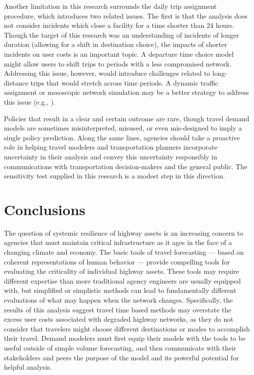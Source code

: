 \documentclass[]{ascelike-new}
\begin{document}
Another limitation in this research surrounds the daily trip assignment
procedure, which introduces two related issues. The first is that the
analysis does not consider incidents which close a facility for a time
shorter than 24 hours. Though the target of this research was an
understanding of incidents of longer duration (allowing for a shift in
destination choice), the impacts of shorter incidents on user costs is
an important topic. A departure time choice model might allow users to
shift trips to periods with a less compromised network. Addressing this
issue, however, would introduce challenges related to long-distance
trips that would stretch across time periods. A dynamic traffic
assignment or mesoscopic network simulation may be a better strategy to
address this issue (e.g., ).

Policies that result in a clear and certain outcome are rare, though
travel demand models are sometimes misinterpreted, misused, or even
mis-designed to imply a single policy prediction. Along the same lines,
agencies should take a proactive role in helping travel modelers and
transportation planners incorporate uncertainty in their analysis and
convey this uncertainty responsibly in communications with
transportation decision-makers and the general public. The sensitivity
test supplied in this research is a modest step in this direction.


\section{Conclusions}\label{conclusions}

The question of systemic resilience of highway assets is an increasing
concern to agencies that must maintain critical infrastructure as it
ages in the face of a changing climate and economy. The basic tools of
travel forecasting --- based on coherent representations of human
behavior --- provide compelling tools for evaluating the criticality of
individual highway assets. These tools may require different expertise
than more traditional agency engineers are usually equipped with, but
simplified or simplistic methods can lead to fundamentally different
evaluations of what may happen when the network changes. Specifically,
the results of this analysis suggest travel time based methods may
overstate the excess user costs associated with degraded highway
networks, as they do not consider that travelers might choose different
destinations or modes to accomplish their travel. Demand modelers must
first equip their models with the tools to be useful outside of simple
volume forecasting, and then communicate with their stakeholders and
peers the purpose of the model and its powerful potential for helpful
analysis.
\end{document}
